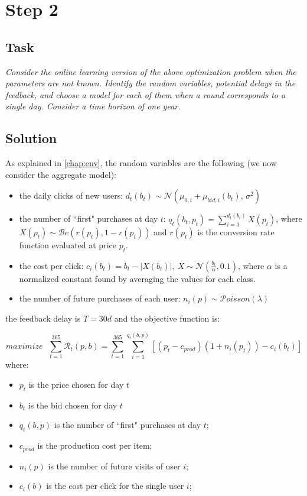 \documentclass[12pt,a4paper]{report}
\begin{document}
		\section{Step 2}
			\subsection{Task}
\textit{Consider the online learning version of the above optimization problem when the parameters are not known. Identify the random variables, potential delays in the feedback, and choose a model for each of them when a round corresponds to a single day. Consider a time horizon of one year.}
			\subsection{Solution}
As explained in  \autoref{chap:env}, the random variables are the following (we now consider the aggregate model):
\begin{itemize}
	\item the daily clicks of new users: $d_t(b_t) \sim \mathcal{N}(\mu_{0,i}+\mu_{bid,i}(b_t),\,\sigma^{2})$
	\item the number of ``first" purchases at day $t$: $q_t(b_t,p_t) = \sum_{i=1}^{d_t(b_t)}{X(p_t)}$, where $X(p_t) \sim \mathcal{B}e(r(p_t), 1-r(p_t))$ and $r(p_t)$ is the conversion rate function evaluated at price $p_t$.
	\item the cost per click: $c_i(b_t) =  b_t - |X(b_t)|, \: X\sim \mathcal{N}(\frac {b_t}{\alpha}, 0.1)$, where $\alpha$ is a normalized constant found by averaging the values for each class.
	\item the number of future purchases of each user: $n_i(p)\sim  \mathcal{P}oisson(\lambda)$
\end{itemize}
the feedback delay is $T=30d$ and the objective function is:

\[ maximize \: \: \:  \sum_{t=1}^{365}{\mathcal R_t(p,b)} = \sum_{t=1}^{365}{\sum_{i=1}^{q_t(b,p)}{[(p_t - c_{prod})(1+n_i(p_t)) - c_i(b_t)]}}\]
where:
\begin{itemize}
	\item $p_t$ is the price chosen for day $t$
	\item $b_t$ is the bid chosen for day $t$
	\item $q_t(b,p)$ is the number of ``first" purchases at day $t$;
	\item $c_{prod}$ is the production cost per item;
	\item $n_i(p)$ is the number of future visits of user $i$;
	\item $c_i(b)$ is the cost per click for the single user $i$; 
\end{itemize}
\end{document}
